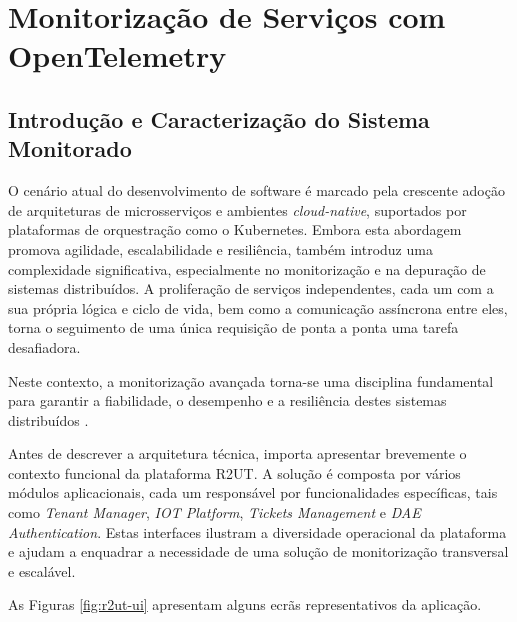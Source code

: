 
\chapter{Monitorização de Serviços com OpenTelemetry}

\section{Introdução e Caracterização do Sistema Monitorado}

O cenário atual do desenvolvimento de software é marcado pela crescente adoção de arquiteturas de microsserviços e ambientes \textit{cloud-native}, suportados por plataformas de orquestração como o Kubernetes. Embora esta abordagem promova agilidade, escalabilidade e resiliência, também introduz uma complexidade significativa, especialmente no monitorização e na depuração de sistemas distribuídos. A proliferação de serviços independentes, cada um com a sua própria lógica e ciclo de vida, bem como a comunicação assíncrona entre eles, torna o seguimento de uma única requisição de ponta a ponta uma tarefa desafiadora.

Neste contexto, a monitorização avançada torna-se uma disciplina fundamental para garantir a fiabilidade, o desempenho e a resiliência destes sistemas distribuídos \cite{Salah2017}.


Antes de descrever a arquitetura técnica, importa apresentar brevemente o contexto funcional da plataforma R2UT. A solução é composta por vários módulos aplicacionais, cada um responsável por funcionalidades específicas, tais como \textit{Tenant Manager}, \textit{IOT Platform}, \textit{Tickets Management} e \textit{DAE Authentication}. Estas interfaces ilustram a diversidade operacional da plataforma e ajudam a enquadrar a necessidade de uma solução de monitorização transversal e escalável.

\clearpage

As Figuras \ref{fig:r2ut-ui} apresentam alguns ecrãs representativos da aplicação.


